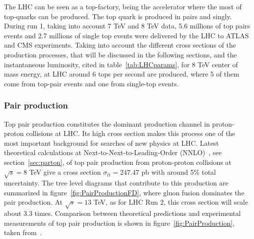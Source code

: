 The LHC can be seen as a top-factory, being the accelerator where the most of top-quarks can be produced. The top quark is produced in pairs and singly. During run 1, taking into account 7 TeV and 8 TeV data, 5.6 millions of top pairs events and 2.7 millions of single top events were delivered by the LHC to ATLAS and CMS experiments. Taking into account the different cross sections of the production processes, that will be discussed in the following sections, and the instantaneous luminosity, cited in table~\ref{tab:LHCparams}, for 8 TeV center of mass energy, at LHC around 6 tops per second are produced, where 5 of them come from top-pair events and one from single-top events.  

\subsubsection{Pair production}
\label{subsec:toppair}

Top pair production constitutes the dominant production channel in proton-proton collisions at LHC. Its high cross section makes this process one of the most important background for searches of new physics at LHC. Latest theoretical calculations at Next-to-Next-to-Leading-Order (NNLO)~\cite{Czakon:2013goa}, see section~\ref{sec:parton}, of top pair production from proton-proton collisions at $\sqrt{s}=8$ TeV give a cross section $\sigma_{t\bar{t}}=247.47$ pb with around 5\% total uncertainty. The tree level diagrams that contribute to this production are summarized in figure~\ref{fig:PairProductionFD}, where gluon fusion dominates the pair production. At $\sqrt{s}=13$ TeV, as for LHC Run 2, this cross section will scale about 3.3 times. Comparison between theoretical predictions and experimental measurements of top pair production is shown in figure~\ref{fig:PairProduction}, taken from~\cite{TOPLHCWG}.

